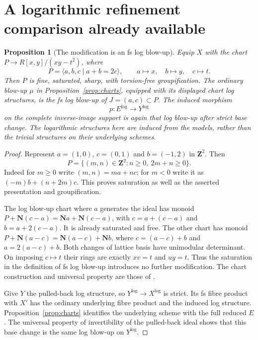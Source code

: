 \documentclass[11pt]{article}
\newtheorem{proposition}[theorem]{Proposition}
\theoremstyle{definition}
\theoremstyle{remark}
\begin{document}
\section{A logarithmic refinement comparison already available}
\begin{proposition}[The modification is an fs log blow-up]
\label{prop:log-blowup}
Equip $X$ with the chart $P\to R[x,y]/(xy-t^2)$, where
\[
 P=\langle a,b,c\mid a+b=2c\rangle,\qquad
 a\mapsto x,\quad b\mapsto y,\quad c\mapsto t.
\]
Then $P$ is fine, saturated, sharp, with torsion-free groupification.
The ordinary blow-up $\mu$ in Proposition~\ref{prop:charts}, equipped
with its displayed chart log structures, is the fs log blow-up of
$J=(a,c)\subset P$.  The induced morphism
\[
 p:E^{\log}\longrightarrow Y^{\log}
\]
on the complete inverse-image support is again that log blow-up after
strict base change.  The logarithmic structures here are induced from
the models, rather than the trivial structures on their underlying schemes.
\end{proposition}
\begin{proof}
Represent $a=(1,0)$, $c=(0,1)$ and $b=(-1,2)$ in $\mathbf Z^2$.  Then
\[
 P=\{(m,n)\in\mathbf Z^2:n\geq0,\ 2m+n\geq0\}.
\]
Indeed for $m\geq0$ write $(m,n)=ma+nc$; for $m<0$ write it as
$(-m)b+(n+2m)c$.  This proves saturation as well as the asserted
presentation and groupification.

The log blow-up chart where $a$ generates the ideal has monoid
$P+\mathbf N(c-a)=\mathbf Na+\mathbf N(c-a)$, with
$c=a+(c-a)$ and $b=a+2(c-a)$.  It is already saturated and free.
The other chart has monoid
$P+\mathbf N(a-c)=\mathbf N(a-c)+\mathbf Nb$, where
$c=(a-c)+b$ and $a=2(a-c)+b$.  Both changes of lattice basis have
unimodular determinant.  On imposing $c\mapsto t$ their rings are
exactly $xv=t$ and $uy=t$.  Thus the saturation in the definition of
fs log blow-up introduces no further modification.  The chart
construction and universal property are those of
\cite[\S6.1]{IllusieOverview}.

Give $Y$ the pulled-back log structure, so $Y^{\log}\to X^{\log}$ is
strict.  Its fs fibre product with $X'$ has the ordinary underlying
fibre product and the induced log structure.  Proposition~\ref{prop:charts}
identifies the underlying scheme with the full reduced $E$.
The universal property of invertibility of the pulled-back ideal
shows that this base change is the same log blow-up on $Y^{\log}$.
\end{proof}
\end{document}
